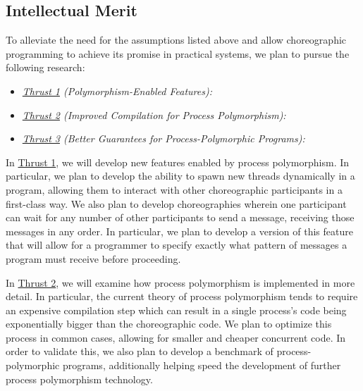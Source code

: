 \subsection{Intellectual Merit}

To alleviate the need for the assumptions listed above and allow choreographic programming to achieve its promise in practical systems, we plan to pursue the following research:
\begin{itemize}
  \item \textit{\hyperref[sec:t1]{Thrust 1} (Polymorphism-Enabled Features):}
  \item \textit{\hyperref[sec:t2]{Thrust 2} (Improved Compilation for Process Polymorphism):}
  \item \textit{\hyperref[sec:t3]{Thrust 3} (Better Guarantees for Process-Polymorphic Programs):}
\end{itemize}


In \hyperref[sec:t1]{Thrust 1}, we will develop new features enabled by process polymorphism.
In particular, we plan to develop the ability to spawn new threads dynamically in a program, allowing them to interact with other choreographic participants in a first-class way.
We also plan to develop choreographies wherein one participant can wait for any number of other participants to send a message, receiving those messages in any order.
In particular, we plan to develop a version of this feature that will allow for a programmer to specify exactly what pattern of messages a program must receive before proceeding.

In \hyperref[sec:t2]{Thrust 2}, we will examine how process polymorphism is implemented in more detail.
In particular, the current theory of process polymorphism tends to require an expensive compilation step which can result in a single process's code being exponentially bigger than the choreographic code.
We plan to optimize this process in common cases, allowing for smaller and cheaper concurrent code.
In order to validate this, we also plan to develop a benchmark of process-polymorphic programs, additionally helping speed the development of further process polymorphism technology.

